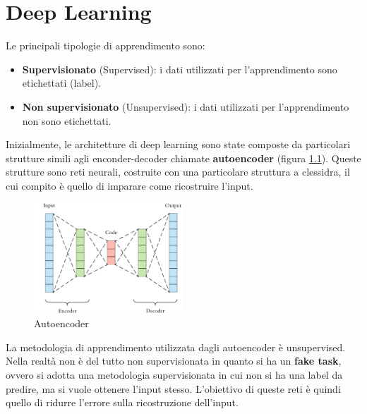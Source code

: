 \chapter{Deep Learning}
Le principali tipologie di apprendimento sono:
\begin{itemize}
      \item \textbf{Supervisionato} (Supervised): i dati utilizzati per
            l'apprendimento sono etichettati (label).
      \item \textbf{Non supervisionato} (Unsupervised): i dati utilizzati per
            l'apprendimento non sono etichettati.
\end{itemize}
Inizialmente, le architetture di deep learning sono state composte da
particolari strutture simili agli enconder-decoder chiamate \textbf{autoencoder}
(figura \ref{fig:autoencoder}). Queste strutture sono reti neurali, costruite
con una particolare struttura a clessidra, il cui compito è quello di imparare
come ricostruire l'input.
\begin{figure}[!ht]
      \centering
      \includegraphics[width=0.5\textwidth]{img/reti/autoencoder.png}
      \caption{Autoencoder}
      \label{fig:autoencoder}
\end{figure}
La metodologia di apprendimento utilizzata dagli autoencoder è unsupervised.
Nella realtà non è del tutto non supervisionata in quanto si ha un \textbf{fake
      task}, ovvero si adotta una metodologia supervisionata in cui non si ha
una label da predire, ma si vuole ottenere l'input stesso. L'obiettivo di
queste reti è quindi quello di ridurre l'errore sulla ricostruzione dell'input.

